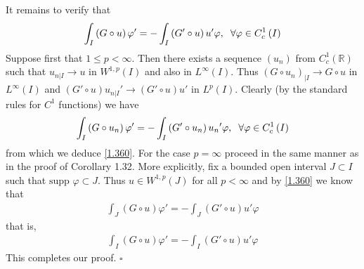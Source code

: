 \documentclass[a4paper,oneside]{article}
\numberwithin{equation}{section}
\begin{document}
It remains to verify that
\begin{align}
\label{1.360}
\int_I {\left( {G \circ u} \right)\varphi '}  =  - \int_I {\left( {G' \circ u} \right)u'\varphi } ,\hspace{0.2cm}\forall \varphi  \in C_c^1\left( I \right)
\end{align}
Suppose first that $1\le p<\infty$. Then there exists a sequence $\left(u_n\right)$ from $C_c^1\left(\mathbb{R}\right)$ such that ${u_{\left. n \right|I}} \to u$ in $W^{1,p}\left(I\right)$ and also in $L^{\infty}\left(I\right)$. Thus ${\left( {G \circ {u_n}} \right)_{|I}} \to G \circ u$ in $L^{\infty}\left(I\right)$ and $\left( {G' \circ u} \right){u_{\left. n \right|I}}' \to \left( {G' \circ u} \right)u'$ in $L^p\left(I\right)$. Clearly (by the standard rules for $C^1$ functions) we have
\begin{align}
\int_I {\left( {G \circ {u_n}} \right)\varphi '}  =  - \int_I {\left( {G' \circ {u_n}} \right){u_n}'\varphi } ,\hspace{0.2cm} \forall \varphi  \in C_c^1\left( I \right)
\end{align}
from which we deduce \eqref{1.360}. For the case $p=\infty$ proceed in the same manner as in the proof of Corollary 1.32. More explicitly, fix a bounded open interval $J\subset I$ such that $\mbox{supp }\varphi \subset J$. Thus $u\in W^{1,p}\left(J\right)$ for all $p<\infty$ and by \eqref{1.360} we know that
\begin{align}
\int_J {\left( {G \circ u} \right)\varphi '}  =  - \int_J {\left( {G' \circ u} \right)u'\varphi } 
\end{align}
that is,
\begin{align}
\int_I {\left( {G \circ u} \right)\varphi '}  =  - \int_I {\left( {G' \circ u} \right)u'\varphi } 
\end{align}
This completes our proof. \hfill $\square$
\end{document}
